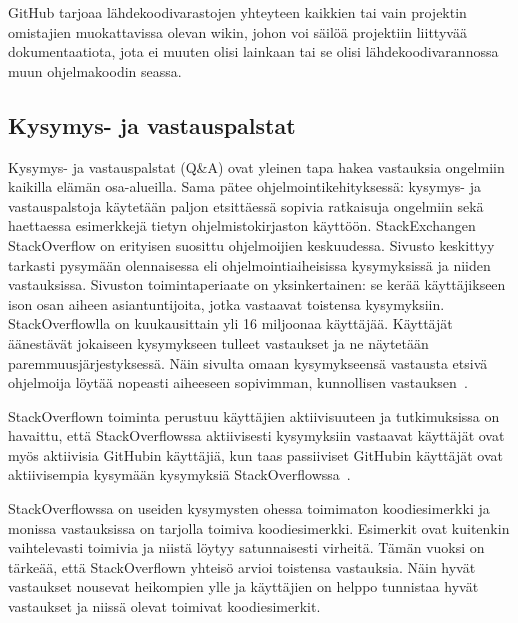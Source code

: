 \documentclass[finnish]{tktltiki2}
\theoremstyle{definition}
\theoremstyle{remark}
\begin{document}
GitHub tarjoaa lähdekoodivarastojen yhteyteen kaikkien tai vain projektin omistajien muokattavissa olevan wikin, johon voi säilöä projektiin liittyvää dokumentaatiota, jota ei muuten olisi lainkaan tai se olisi lähdekoodivarannossa muun ohjelmakoodin seassa.

\subsection{Kysymys- ja vastauspalstat}
Kysymys- ja vastauspalstat (Q\&A) ovat yleinen tapa hakea vastauksia ongelmiin kaikilla elämän osa-alueilla. Sama pätee ohjelmointikehityksessä: kysymys- ja vastauspalstoja käytetään paljon etsittäessä sopivia ratkaisuja ongelmiin sekä haettaessa esimerkkejä tietyn ohjelmistokirjaston käyttöön. StackExchangen StackOverflow on erityisen suosittu ohjelmoijien keskuudessa. Sivusto keskittyy tarkasti pysymään olennaisessa eli ohjelmointiaiheisissa kysymyksissä ja niiden vastauksissa. Sivuston toimintaperiaate on yksinkertainen: se kerää käyttäjikseen ison osan aiheen asiantuntijoita, jotka vastaavat toistensa kysymyksiin. StackOverflowlla on kuukausittain yli 16 miljoonaa käyttäjää. Käyttäjät äänestävät jokaiseen kysymykseen tulleet vastaukset ja ne näytetään paremmuusjärjestyksessä. Näin sivulta omaan kysymykseensä vastausta etsivä ohjelmoija löytää nopeasti aiheeseen sopivimman, kunnollisen vastauksen~\cite{social-networking-meets-se}.

StackOverflown toiminta perustuu käyttäjien aktiivisuuteen ja tutkimuksissa on havaittu, että StackOverflowssa aktiivisesti kysymyksiin vastaavat käyttäjät ovat myös aktiivisia GitHubin käyttäjiä, kun taas passiiviset GitHubin käyttäjät ovat aktiivisempia kysymään kysymyksiä StackOverflowssa~\cite{stackoverflow-and-github}.

StackOverflowssa on useiden kysymysten ohessa toimimaton koodiesimerkki ja monissa vastauksissa on tarjolla toimiva koodiesimerkki. Esimerkit ovat kuitenkin vaihtelevasti toimivia ja niistä löytyy satunnaisesti virheitä. Tämän vuoksi on tärkeää, että StackOverflown yhteisö arvioi toistensa vastauksia. Näin hyvät vastaukset nousevat heikompien ylle ja käyttäjien on helppo tunnistaa hyvät vastaukset ja niissä olevat toimivat koodiesimerkit.
\end{document}

